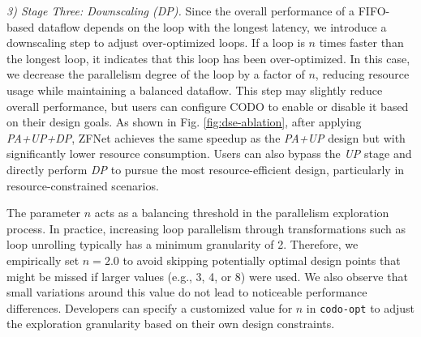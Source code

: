 \documentclass[conference]{IEEEtran}
\begin{document}
\textit{3) Stage Three: Downscaling (\textit{DP}).} Since the overall performance of a FIFO-based dataflow depends on the loop with the longest latency, we introduce a downscaling step to adjust over-optimized loops. If a loop is \( n \) times faster than the longest loop,
it indicates that this loop has been over-optimized. 
In this case, we decrease the parallelism degree of the loop by a factor of \( n \), reducing resource usage while maintaining a balanced dataflow. This step may slightly reduce overall performance, but users can configure CODO to enable or disable it based on their design goals.  As shown in Fig. \ref{fig:dse-ablation}, after applying \textit{PA+UP+DP}, ZFNet achieves the same speedup as the \textit{PA+UP} design but with significantly lower resource consumption. Users can also bypass the \textit{UP} stage and directly perform \textit{DP} to pursue the most resource-efficient design, particularly in resource-constrained scenarios.


The parameter \( n \) acts as a balancing threshold in the parallelism exploration process. In practice, increasing loop parallelism through transformations such as loop unrolling typically has a minimum granularity of 2. Therefore, we empirically set \( n = 2.0 \) to avoid skipping potentially optimal design points that might be missed if larger values (e.g., 3, 4, or 8) were used. We also observe that small variations around this value do not lead to noticeable performance differences. Developers can specify a customized value for  \( n \) in \texttt{codo-opt} to adjust the exploration granularity based on their own design constraints.
\end{document}
